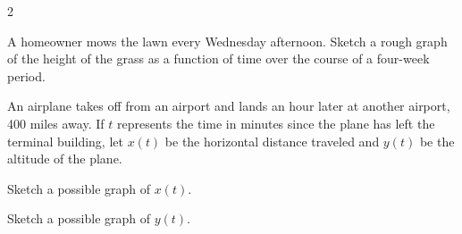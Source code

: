 \documentclass{sebase}
\begin{document}
\begin{multicols}{2}
\begin{ExerciseList}
\item[$\hfill $17.] A homeowner mows the lawn every Wednesday afternoon.
Sketch a rough graph of the height of the grass as a function of time over
the course of a four-week period.

%

%

\item[$\hfill $18.] An airplane takes off from an airport and lands an hour
later at another airport, 400 miles away. If $t$ represents the time in
minutes since the plane has left the terminal building, let $x(t)$ be the
horizontal distance traveled and $y(t)$ be the altitude of the plane.

\begin{ExerciseList}
\item[(a)] Sketch a possible graph of $x(t)$.

%

\item[(b)] Sketch a possible graph of $y(t)$.

%


\end{ExerciseList}
\end{ExerciseList}
\end{multicols}
\end{document}
